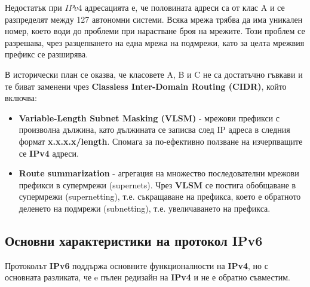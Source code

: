 \documentclass[fleqn,12pt]{article}
\begin{document}
\begin{flushleft}
Недостатък при $IPv4$ адресацията е, че половината адреси са от клас A и се разпределят между 127 автономни системи.
Всяка мрежа трябва да има уникален номер, което води до проблеми при нарастване броя на мрежите.
Този проблем се разрешава, чрез разцепването на една мрежа на подмрежи, като за целта мрежвия префикс се разширява.

В исторически план се оказва, че класовете A, B и C не са достатъчно гъвкави и те биват заменени чрез \textbf{Classless Inter-Domain Routing (CIDR)}, който включва:
\begin{itemize}
    \item \textbf{Variable-Length Subnet Masking (VLSM)} - мрежови префикси с произволна дължина, като дължината се записва след IP адреса в следния формат \textbf{x.x.x.x/length}.
    Спомага за по-ефективно ползване на изчерпващите се \textbf{IPv4} адреси.
    \item \textbf{Route summarization} - агрегация на множество последователни мрежови префикси в супермрежи (supernets).
    Чрез \textbf{VLSM} се постига обобщаване в супермрежи (supernetting), т.е. съкращаване на префикса, което е обратното деленето на подмрежи (subnetting), т.е. увеличаването на префикса.
\end{itemize}

\subsection{Основни характеристики на протокол IPv6}

Протоколът \textbf{IPv6} поддържа основните функционалности на \textbf{IPv4}, но с основната разликата, че e пълен редизайн на \textbf{IPv4} и не е обратно съвместим.


\end{flushleft}
\end{document}
